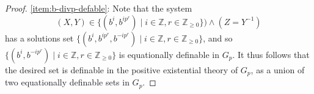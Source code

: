 \documentclass[10pt,a4paper]{amsart}
\newcommand{\Z}{\mathbb{Z}}
\begin{document}
\begin{proof}
	\eqref{item:b-divp-defable}: Note that the system
	\[
			(X, Y) \in \{(b^i, b^{i p^r}) \mid i \in \Z, r \in \Z_{\geq 0}\}) \wedge
			(Z = Y^{-1})
	\]
	has a solutions set \(\{(b^i, b^{i p^r}, b^{-ip^r}) \mid i \in \Z, r \in \Z_{\geq 0}\}\),
	and so \(\{(b^i, b^{-ip^r}) \mid i \in \Z, r \in \Z_{\geq 0}\}\) is equationally
	definable in \(G_p\). It thus follows that the desired set is definable in the
	positive existential theory of \(G_p\), as a union of two equationally definable
	sets in \(G_p\).
\end{proof}
\end{document}

